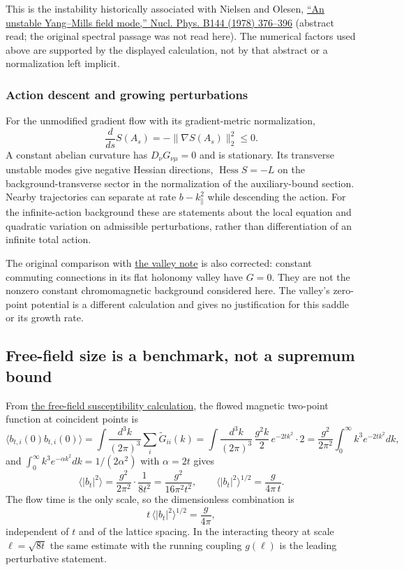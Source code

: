 \documentclass[11pt,a4paper]{article}
\begin{document}
This is the instability historically associated with Nielsen and Olesen,
\href{https://doi.org/10.1016/0550-3213(78)90377-2}{``An unstable
Yang--Mills field mode,'' Nucl. Phys. B144 (1978) 376--396} (abstract
read; the original spectral passage was not read here). The numerical
factors used above are supported by the displayed calculation, not by
that abstract or a normalization left implicit.

\hypertarget{action-descent-and-growing-perturbations}{%
\subsubsection{Action descent and growing
perturbations}\label{action-descent-and-growing-perturbations}}

For the unmodified gradient flow with its gradient-metric normalization,
\[\frac{d}{ds}S(A_s)=-\|\nabla S(A_s)\|_2^2\le0.\] A constant abelian
curvature has \(D_\nu G_{\nu\mu}=0\) and is stationary. Its transverse
unstable modes give negative Hessian directions,
\(\operatorname{Hess}S=-L\) on the background-transverse sector in the
normalization of the auxiliary-bound section. Nearby trajectories can
separate at rate \(b-k_\parallel^2\) while descending the action. For
the infinite-action background these are statements about the local
equation and quadratic variation on admissible perturbations, rather
than differentiation of an infinite total action.

The original comparison with \href{torus-valley-potential.md}{the valley
note} is also corrected: constant commuting connections in its flat
holonomy valley have \(G=0\). They are not the nonzero constant
chromomagnetic background considered here. The valley's zero-point
potential is a different calculation and gives no justification for this
saddle or its growth rate.

\hypertarget{free-field-size-is-a-benchmark-not-a-supremum-bound}{%
\subsection{Free-field size is a benchmark, not a supremum
bound}\label{free-field-size-is-a-benchmark-not-a-supremum-bound}}

From \href{finiteness-half-flowed-susceptibility.md\#susceptibility}{the
free-field susceptibility calculation}, the flowed magnetic two-point
function at coincident points is
\[\big\langle b_{t,i}(0)b_{t,i}(0)\big\rangle
=\int\!\frac{d^3k}{(2\pi)^3}\sum_i\tilde G_{ii}(k)
=\int\!\frac{d^3k}{(2\pi)^3}\,\frac{g^2k}{2}\,e^{-2tk^2}\cdot2
=\frac{g^2}{2\pi^2}\int_0^\infty\!k^3e^{-2tk^2}dk,\] and
\(\int_0^\infty k^3e^{-\alpha k^2}dk=1/(2\alpha^2)\) with \(\alpha=2t\)
gives
\[\big\langle|b_t|^2\big\rangle=\frac{g^2}{2\pi^2}\cdot\frac1{8t^2}=\frac{g^2}{16\pi^2t^2},
\qquad \big\langle|b_t|^2\big\rangle^{1/2}=\frac{g}{4\pi\,t}.\] The flow
time is the only scale, so the dimensionless combination is
\[t\,\big\langle|b_t|^2\big\rangle^{1/2}=\frac{g}{4\pi},\] independent
of \(t\) and of the lattice spacing. In the interacting theory at scale
\(\ell=\sqrt{8t}\) the same estimate with the running coupling
\(g(\ell)\) is the leading perturbative statement.
\end{document}
